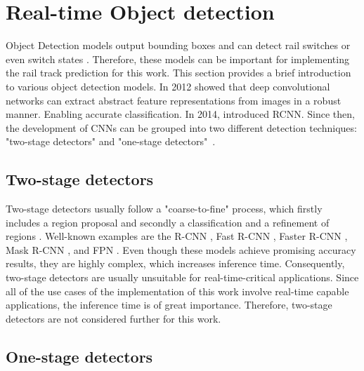 \section{Real-time Object detection}
\label{sec:ObjectDetection}

Object Detection models output bounding boxes and can detect rail switches or even switch states \cite{railsem19dataset}.
Therefore, these models can be important for implementing the rail track prediction for this work.
This section provides a brief introduction to various object detection models.
In 2012 \cite{AlexNet2012} showed that deep convolutional networks can extract abstract feature representations from images in a robust manner.
Enabling accurate classification.
In 2014, \cite{RCNN2014} introduced \ac{RCNN}.
Since then, the development of \ac{CNN}s can be grouped into two different detection techniques: "two-stage detectors" and "one-stage detectors"~\cite{20yearsSurvey, surveyObjectDetection, surveyObjectDetection2019}.

\vspace{0.5cm}

\subsection{Two-stage detectors}

Two-stage detectors usually follow a "coarse-to-fine" process, which firstly includes a region proposal and secondly a classification and a refinement of regions \cite{20yearsSurvey, surveyObjectDetection, surveyObjectDetection2019, twostageObjectDetection}.
Well-known examples are the R-CNN \cite{RCNN2014}, Fast R-CNN \cite{FastRCNN2015}, Faster R-CNN \cite{FasterRCNN2017}, Mask R-CNN \cite{MaskRCNN2017}, and \ac{FPN} \cite{FPN2017_two_stage-detector}.
Even though these models achieve promising accuracy results, they are highly complex, which increases inference time.
Consequently, two-stage detectors are usually unsuitable for real-time-critical applications.
Since all of the use cases of the implementation of this work involve real-time capable applications, the inference time is of great importance.
Therefore, two-stage detectors are not considered further for this work.

\vspace{0.5cm}

\subsection{One-stage detectors}

